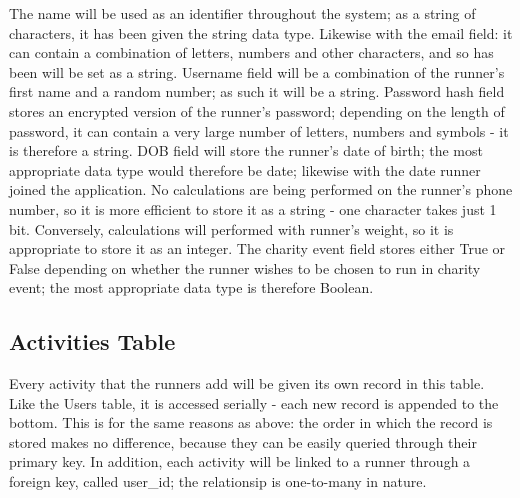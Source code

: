 \documentclass{article}[12pt,a4paper]
\begin{document}
The name will be used as an identifier throughout the system; as a string of characters, it has been given the string data type. Likewise with the email field: it can contain a combination of letters, numbers and other characters, and so has been will be set as a string. Username field will be a combination of the runner's first name and a random number; as such it will be a string. Password hash field stores an encrypted version of the runner's password; depending on the length of password, it can contain a very large number of letters, numbers and symbols - it is therefore a string. DOB field will store the runner's date of birth; the most appropriate data type would therefore be date; likewise with the date runner joined the application. No calculations are being performed on the runner's phone number, so it is more efficient to store it as a string - one character takes just 1 bit. Conversely, calculations will performed with runner's weight, so it is appropriate to store it as an integer. The charity event field stores either True or False depending on whether the runner wishes to be chosen to run in charity event; the most appropriate data type is therefore Boolean.

\subsection{Activities Table}

Every activity that the runners add will be given its own record in this table. Like the Users table, it is accessed serially - each new record is appended to the bottom. This is for the same reasons as above: the order in which the record is stored makes no difference, because they can be easily queried through their primary key. In addition, each activity will be linked to a runner through a foreign key, called user\_id; the relationsip is one-to-many in nature.
\end{document}

